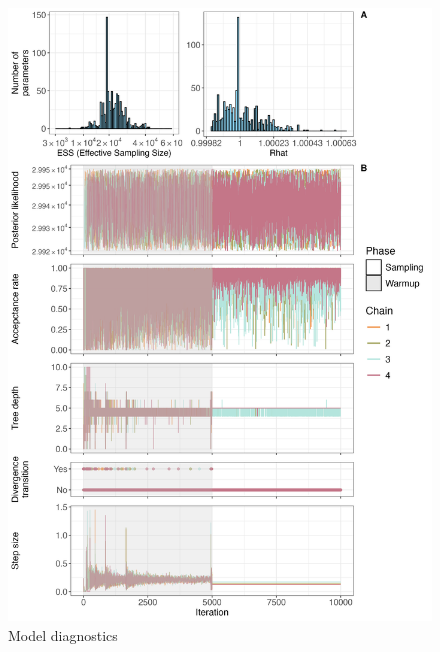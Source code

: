 \documentclass{article}
\begin{document}
\begin{figure}[tbhp] 
\centering
\includegraphics[width=16.5cm]{Plots/Diagnostic_Fig_1.jpg}  
\caption{Model diagnostics}
\label{fig:diagnostics}
\end{figure}
\end{document}

